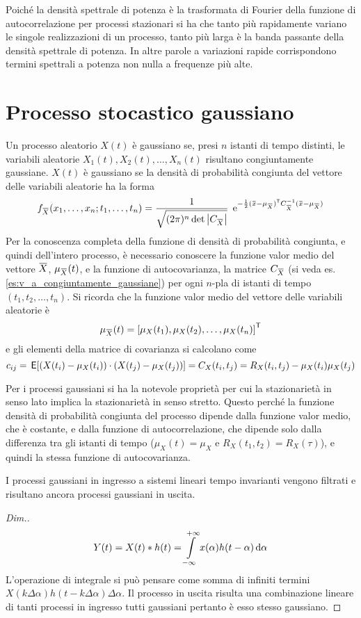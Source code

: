 \begin{nota}
Poiché la densità spettrale di potenza è la trasformata di Fourier della funzione di autocorrelazione per processi stazionari si ha che tanto più rapidamente variano le singole realizzazioni di un processo, tanto più larga è la banda passante della densità spettrale di potenza. In altre parole a variazioni rapide corrispondono termini spettrali a potenza non nulla a frequenze più alte.\end{nota}

\section{Processo stocastico gaussiano}
Un processo aleatorio $X(t)$ è gaussiano se, presi $n$ istanti di tempo distinti, le variabili aleatorie $X_1(t),X_2(t),\dots,X_n(t)$ risultano congiuntamente gaussiane.
$X(t)$ è gaussiano se la densità di probabilità congiunta del vettore delle variabili aleatorie ha la forma
\begin{equation}
f_\vect{X}(x_1,\dots,x_n;t_1,\dots,t_n)=\frac{1}{\sqrt{(2\pi)^n\det\abs{ C_\vect{X}}}}\;\e{-\frac{1}{2}\trasp{(\vect{x}-\mu_\vect{X})}C^{-1}_\vect{X}(\vect{x}-\mu_\vect{X})}
\end{equation}
Per la conoscenza completa della funzione di densità di probabilità congiunta, e quindi dell'intero processo, è necessario conoscere la funzione valor medio del vettore $\vect{X}$, $\mu_\vect{X}(t)$, e la funzione di autocovarianza, la matrice $C_\vect{X}$ (si veda es.\ref{es:v_a_congiuntamente_gaussiane}) per ogni $n$-pla di istanti di tempo $(t_1,t_2,\dots,t_n)$. Si ricorda che la funzione valor medio del vettore delle variabili aleatorie è
\[\mu_\vect{X}(t)=\trasp{[\mu_X(t_1),\mu_X(t_2),\dots,\mu_X(t_n)]}\]
e gli elementi della matrice di covarianza si calcolano come 
\[c_{ij}=\,{\operatorname{\mathsf{E}}}\!\left[{(X(t_i)-\mu_X(t_i))\cdot (X(t_j)-\mu_X(t_j))}\right]=C_X(t_i,t_j)=R_X(t_i,t_j)-\mu_X(t_i)\mu_X(t_j)\]

Per i processi gaussiani si ha la notevole proprietà per cui la stazionarietà in senso lato implica la stazionarietà in senso stretto. Questo perché la funzione densità di probabilità congiunta del processo dipende dalla funzione valor medio, che è costante, e dalla funzione di autocorrelazione, che dipende solo dalla differenza tra gli istanti di tempo ($\mu_X(t)=\mu_X$ e $R_X(t_1,t_2)=R_X(\tau)$), e quindi la stessa funzione di autocovarianza.

I processi gaussiani in ingresso a sistemi lineari tempo invarianti vengono filtrati e risultano ancora processi gaussiani in uscita.
\begin{proof}[Dim.]
\[Y(t)=X(t)\ast h(t)=\int\limits_{-\infty}^{+\infty}{x(\alpha)h(t-\alpha)}{\,\mathop{}\!\mathrm{d}{\alpha}}\]
L'operazione di integrale si può pensare come somma di infiniti termini $X(k\Delta\alpha)h(t-k\Delta\alpha)\Delta\alpha$. Il processo in uscita risulta una combinazione lineare di tanti processi in ingresso tutti gaussiani pertanto è esso stesso gaussiano.
\end{proof}

